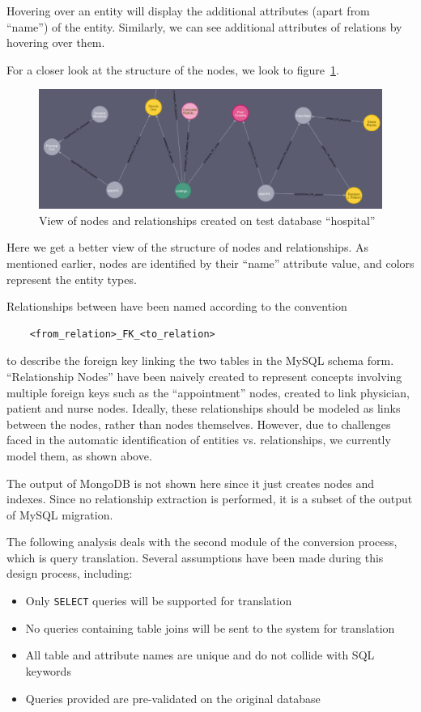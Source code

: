 \documentclass[12pt]{article}
\begin{document}
    Hovering over an entity will display the additional attributes (apart from ``name'') of the entity. Similarly, we can see additional attributes of relations by hovering over them. 

    For a closer look at the structure of the nodes, we look to figure~\ref{fig:node_subset}.

    \begin{figure}[htb!]
        \centering
        \includegraphics[width=155mm]{img/node_subset.png}
        \caption{View of nodes and relationships created on test database ``hospital''}
        \label{fig:node_subset}
    \end{figure}

    Here we get a better view of the structure of nodes and relationships. As mentioned earlier, nodes are identified by their ``name'' attribute value, and colors represent the entity types. 

    Relationships between have been named according to the convention 
    \begin{lstlisting}
    <from_relation>_FK_<to_relation>    
    \end{lstlisting} 
    to describe the foreign key linking the two tables in the MySQL schema form. ``Relationship Nodes'' have been naively created to represent concepts involving multiple foreign keys such as the ``appointment'' nodes, created to link physician, patient and nurse nodes. Ideally, these relationships should be modeled as links between the nodes, rather than nodes themselves. However, due to challenges faced in the automatic identification of entities vs. relationships, we currently model them, as shown above.

    The output of MongoDB is not shown here since it just creates nodes and indexes. Since no relationship extraction is performed, it is a subset of the output of MySQL migration.

    The following analysis deals with the second module of the conversion process, which is query translation. Several assumptions have been made during this design process, including:
    \begin{itemize}
        \item Only \verb|SELECT| queries will be supported for translation 
        \item No queries containing table joins will be sent to the system for translation 
        \item All table and attribute names are unique and do not collide with SQL keywords
        \item Queries provided are pre-validated on the original database 
    \end{itemize}
\end{document}
